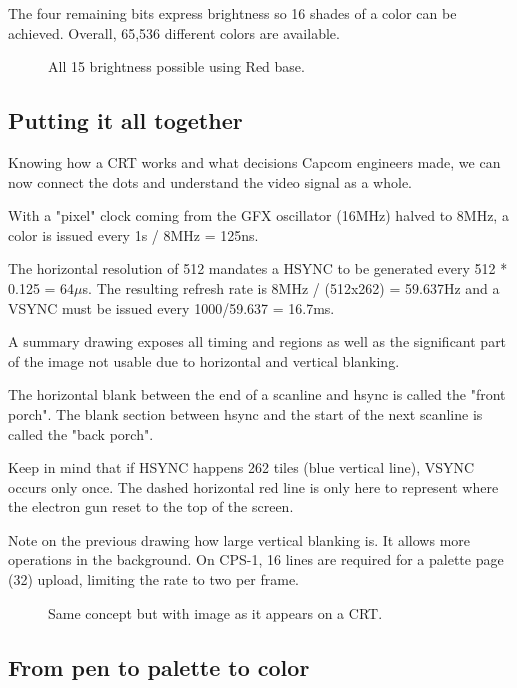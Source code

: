 The four remaining bits express brightness so 16 shades of a color can be achieved. Overall, 65,536 different colors are available.

\begin{figure}[H]
\caption*{All 15 brightness possible using Red  base.}
\end{figure}

\subsection{Putting it all together}

Knowing how a CRT works and what decisions Capcom engineers made, we can now connect the dots and understand the video signal as a whole.

With a "pixel" clock coming from the GFX oscillator (16MHz) halved to 8MHz, a color is issued every 1s / 8MHz = 125ns.

The horizontal resolution of 512 mandates a HSYNC to be generated every 512 * 0.125 = 64$\mu$s. The resulting refresh rate is 8MHz / (512x262) = 59.637Hz and a VSYNC must be issued every 1000/59.637 = 16.7ms.

A summary drawing exposes all timing and regions as well as the significant part of the image not usable due to horizontal and vertical blanking.

\begin{trivia}
The horizontal blank between the end of a scanline and hsync is called the "front porch". The blank section between hsync and the start of the next scanline is called the "back porch".
\end{trivia}


Keep in mind that if HSYNC happens 262 tiles (blue vertical line), VSYNC occurs only once. The dashed horizontal red line is only here to represent where the electron gun reset to the top of the screen.

Note on the previous drawing how large vertical blanking is. It allows more operations in the background. On CPS-1, 16 lines are required for a palette page (32) upload, limiting the rate to two per frame.

\begin{figure}[H]
\caption*{Same concept but with image as it appears on a CRT.}
\end{figure}


\subsection{From pen to palette to color}

